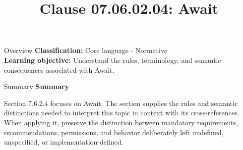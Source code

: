 \documentclass[10pt,letterpaper]{article}
\title{Clause 07.06.02.04: Await}
\author{}
\date{}
\begin{document}
\maketitle
\begin{CornellOverviewBox}{Overview}
\textbf{Classification:} Core language - Normative\\[2pt]
\textbf{Learning objective:} Understand the rules, terminology, and semantic consequences associated with Await.
\end{CornellOverviewBox}\begin{CornellSummaryBox}{Summary}
{\sffamily\bfseries\color{Accent} Summary}\par\vspace{3pt}Section 7.6.2.4 focuses on Await. The section supplies the rules and semantic distinctions needed to interpret this topic in context with its cross-references. When applying it, preserve the distinction between mandatory requirements, recommendations, permissions, and behavior deliberately left undefined, unspecified, or implementation-defined.
\end{CornellSummaryBox}
\end{document}
